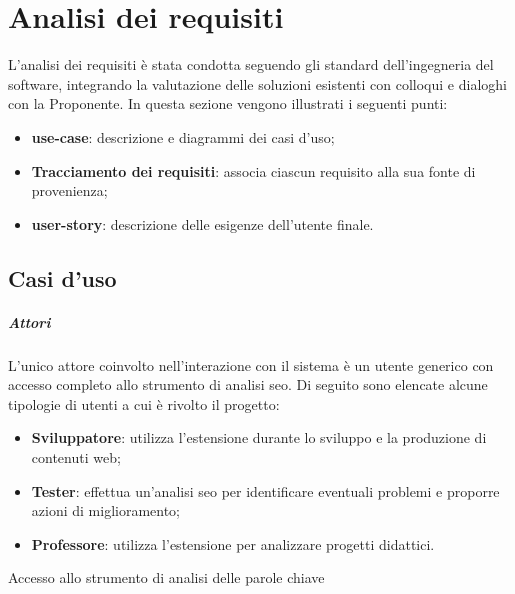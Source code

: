 \chapter{Analisi dei requisiti}
\label{cap:analisi-requisiti}

L'analisi dei \gls{requisiti} è stata condotta seguendo gli standard dell'ingegneria del software, integrando la valutazione delle soluzioni esistenti con colloqui e dialoghi con la Proponente. In questa sezione vengono illustrati i seguenti punti:
\begin{itemize}
    \item \textbf{\Gls{use-case}}: descrizione e diagrammi dei casi d'uso;
    \item \textbf{Tracciamento dei requisiti}: associa ciascun requisito alla sua fonte di provenienza;
    \item \textbf{\Gls{user-story}}: descrizione delle esigenze dell’utente finale.
\end{itemize}

\section{Casi d'uso}

\paragraph*{Attori}
L'unico attore coinvolto nell'interazione con il sistema è un utente generico con accesso completo allo strumento di analisi \gls{seo}. Di seguito sono elencate alcune tipologie di utenti a cui è rivolto il progetto:
\begin{itemize}
    \item \textbf{Sviluppatore}: utilizza l'estensione durante lo sviluppo e la produzione di contenuti web;
    \item \textbf{Tester}: effettua un'analisi \gls{seo} per identificare eventuali problemi e proporre azioni di miglioramento;
    \item \textbf{Professore}: utilizza l'estensione per analizzare progetti didattici.
\end{itemize}

\begin{usecase}{1}{Accesso allo strumento di analisi delle parole chiave}\label{UC1}
\end{usecase}

